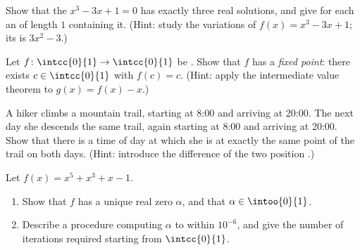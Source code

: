 \begin{exercise}[$\star\star$]\label{exo:g12:limcont:6}
Show that the  $x^3 - 3x + 1 = 0$ has exactly three real solutions,
and give for each an  of length $1$ containing it.
(Hint: study the variations of $f(x) = x^3 - 3x + 1$; its  is
$3x^2 - 3$.)
\end{exercise}

\begin{exercise}[$\star\star$]\label{exo:g12:limcont:7}
Let $f \colon \intcc{0}{1} \to \intcc{0}{1}$ be . Show that $f$ has
a \emph{fixed point}: there exists $c \in \intcc{0}{1}$ with $f(c) = c$.
(Hint: apply the intermediate value theorem to $g(x) = f(x) - x$.)
\end{exercise}

\begin{exercise}[$\star\star\star$]\label{exo:g12:limcont:8}
A hiker climbs a mountain trail, starting at 8:00 and arriving at 20:00. The
next day she descends the same trail, again starting at 8:00 and arriving at
20:00. Show that there is a time of day at which she is at exactly the same
point of the trail on both days. (Hint: introduce the difference of the two
position .)
\end{exercise}

\begin{exercise}[$\star\star\star$]\label{exo:g12:limcont:9}
Let $f(x) = x^5 + x^3 + x - 1$.
\begin{enumerate}
  \item Show that $f$ has a unique real zero $\alpha$, and that
        $\alpha \in \intoo{0}{1}$.
  \item Describe a  procedure computing $\alpha$ to within
        $10^{-6}$, and give the number of iterations required starting from
        $\intcc{0}{1}$.
\end{enumerate}
\end{exercise}
